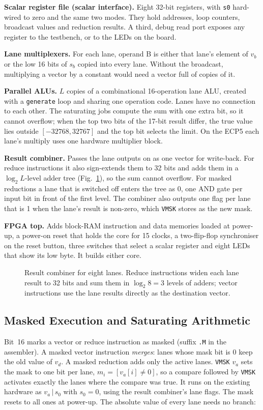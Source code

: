 \textbf{Scalar register file (scalar interface).} Eight 32-bit registers, with
\texttt{s0} hard-wired to zero and the same two modes. They hold addresses, loop
counters, broadcast values and reduction results. A third, debug read port exposes any
register to the testbench, or to the LEDs on the board.

\textbf{Lane multiplexers.} For each lane, operand B is either that lane's element of
$v_b$ or the low 16 bits of $s_b$ copied into every lane. Without the broadcast,
multiplying a vector by a constant would need a vector full of copies of it.

\textbf{Parallel ALUs.} $L$ copies of a combinational 16-operation lane ALU, created
with a \texttt{generate} loop and sharing one operation code. Lanes have no connection
to each other. The saturating jobs compute the sum with one extra bit, so it cannot
overflow; when the top two bits of the 17-bit result differ, the true value lies outside
$[-32768, 32767]$ and the top bit selects the limit. On the ECP5 each lane's multiply
uses one hardware multiplier block.

\textbf{Result combiner.} Passes the lane outputs on as one vector for write-back. For
reduce instructions it also sign-extends them to 32 bits and adds them in a
$\log_2 L$-level adder tree (Fig.~\ref{fig:combiner}), so the sum cannot overflow. For
masked reductions a lane that is switched off enters the tree as 0, one AND gate per
input bit in front of the first level. The combiner also outputs one flag per lane that
is 1 when the lane's result is non-zero, which \texttt{VMSK} stores as the new mask.

\textbf{FPGA top.} Adds block-RAM instruction and data memories loaded at power-up, a
power-on reset that holds the core for 15 clocks, a two-flip-flop synchroniser on the
reset button, three switches that select a scalar register and eight LEDs that show its
low byte. It builds either core.

\begin{figure}[t]
\centering

\caption{Result combiner for eight lanes. Reduce instructions widen each lane result to
32 bits and sum them in $\log_2 8 = 3$ levels of adders; vector instructions use the
lane results directly as the destination vector.}
\label{fig:combiner}
\end{figure}

\subsection{Masked Execution and Saturating Arithmetic}\label{sec:mask}
Bit~16 marks a vector or reduce instruction as masked (suffix \texttt{.M} in the
assembler). A masked vector instruction \emph{merges}: lanes whose mask bit is 0 keep the
old value of $v_d$. A masked reduction adds only the active lanes. \texttt{VMSK} $v_a$
sets the mask to one bit per lane, $m_i = [v_a[i] \neq 0]$, so a compare followed by
\texttt{VMSK} activates exactly the lanes where the compare was true. It runs on the
existing hardware as $v_a \,|\, s_0$ with $s_0 = 0$, using the result combiner's lane
flags. The mask resets to all ones at power-up. The absolute value of every lane needs no
branch:

